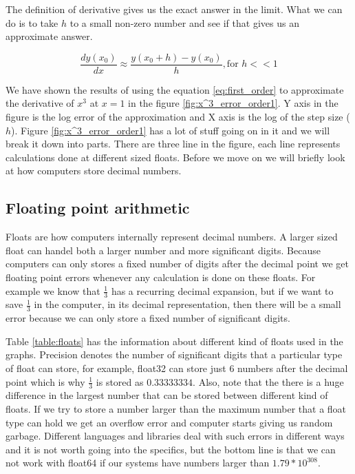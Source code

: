The definition of derivative gives us the exact answer in the limit. What we can do is to take $h$ to a small non-zero number and see if that gives us an approximate answer.

\begin{equation}
    \frac{dy(x_0)}{dx} \approx \frac{y(x_0 + h) - y(x_0)}{h} , \text{for } h << 1
\end{equation}\label{eq:first_order}

We have shown the results of using the equation \ref{eq:first_order} to approximate the derivative of $x^3$ at $x=1$ in the figure \ref{fig:x^3_error_order1}. Y axis in the figure is the log error of the approximation and X axis is the log of the  step size ($h$). Figure \ref{fig:x^3_error_order1} has a lot of stuff going on in it and we will break it down into parts. There are three line in the figure, each line represents calculations done at different sized floats. Before we move on we will briefly look at how computers store decimal numbers.

\subsection{Floating point arithmetic}

 Floats are how computers internally represent decimal numbers. A larger sized float can handel both a larger number and more significant digits. Because computers can only stores a fixed number of digits after the decimal point we get  floating point errors whenever any calculation is done on these floats. For example we know that $\frac{1}{3}$ has a recurring decimal expansion, but if we want to save $\frac{1}{3}$ in the computer, in its decimal representation, then there will be a small error because we can only store a fixed number of significant digits.


Table \ref{table:floats} has the information about different kind of floats used in the graphs. Precision denotes the number of significant digits that a particular type of float can store, for example, float32 can store just 6 numbers after the decimal point which is why $\frac{1}{3}$ is stored as $0.33333334$. Also, note that the there is a huge difference in the largest number that can be stored between different kind of floats. If we try to store a number larger than the maximum number that a float type can hold we get an overflow error and computer starts giving us random garbage. Different languages and libraries deal with such errors in different ways and it is not worth going into the specifics, but the bottom line is that we can not work with float64 if our systems have numbers larger than $1.79*10^{308}$.


